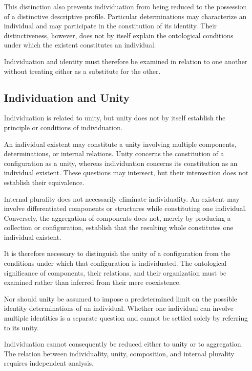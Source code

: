 This distinction also prevents individuation from being reduced
to the possession of a distinctive descriptive profile. Particular
determinations may characterize an individual and may participate
in the constitution of its identity. Their distinctiveness,
however, does not by itself explain the ontological conditions
under which the existent constitutes an individual.

Individuation and identity must therefore be examined in relation
to one another without treating either as a substitute for the
other.

\subsection{Individuation and Unity}

Individuation is related to unity, but unity does not by itself
establish the principle or conditions of individuation.

An individual existent may constitute a unity involving multiple
components, determinations, or internal relations. Unity concerns
the constitution of a configuration as a unity, whereas
individuation concerns its constitution as an individual existent.
These questions may intersect, but their intersection does not
establish their equivalence.

Internal plurality does not necessarily eliminate individuality.
An existent may involve differentiated components or structures
while constituting one individual. Conversely, the aggregation
of components does not, merely by producing a collection or
configuration, establish that the resulting whole constitutes
one individual existent.

It is therefore necessary to distinguish the unity of a
configuration from the conditions under which that configuration
is individuated. The ontological significance of components,
their relations, and their organization must be examined rather
than inferred from their mere coexistence.

Nor should unity be assumed to impose a predetermined limit on
the possible identity determinations of an individual. Whether
one individual can involve multiple identities is a separate
question and cannot be settled solely by referring to its unity.

Individuation cannot consequently be reduced either to unity
or to aggregation. The relation between individuality, unity,
composition, and internal plurality requires independent analysis.

